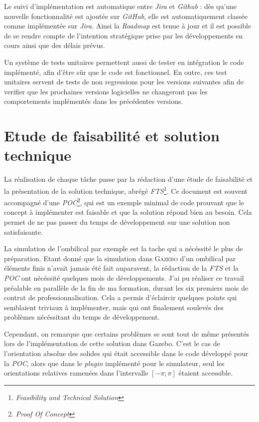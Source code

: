 			Le suivi d'implémentation est automatique entre \textit{Jira} et \textit{Github} : dès qu'une nouvelle fonctionnalité est ajoutée sur \textit{GitHub}, elle est automatiquement classée comme implémentée sur \textit{Jira}. Ainsi la \textit{Roadmap} est tenue à jour et il est possible de se rendre compte de l'intention stratégique prise par les développements en cours ainsi que des délais prévus.

			Un système de tests unitaires permettent aussi de tester en intégration le code implémenté, afin d'être sûr que le code est fonctionnel. En outre, ces test unitaires servent de tests de non regressions pour les versions suivantes afin de verifier que les prochaines versions logicielles ne changeront pas les comportements implémentés dans les précédentes versions.

		\section{Etude de faisabilité et solution technique}

			La réalisation de chaque tâche passe par la rédaction d'une étude de faisabilité et la présentation de la solution technique, abrégé \textit{FTS}\footnote{\textit{Feasibility and Technical Solution}}. Ce document est souvent accompagné d'une \textit{POC}\footnote{\textit{Proof Of Concept}}, qui est un exemple minimal de code prouvant que le concept à implémenter est faisable et que la solution répond bien au besoin. Cela permet de ne pas passer du temps de développement sur une solution non satisfaisante.

			La simulation de l'ombilical par exemple est la tache qui a nécéssité le plus de préparation. Etant donné que la simulation dans \textsc{Gazebo} d'un ombilical par éléments finis n'avait jamais été fait auparavent, la rédaction de la \textit{FTS} et la \textit{POC} ont nécéssité quelques mois de développements. J'ai pu réaliser ce travail préalable en parallèle de la fin de ma formation, durant les six premiers mois de contrat de professionnalisation. Cela a permis d'éclaircir quelques points qui semblaient triviaux à implémenter, mais qui ont finalement soulevés des problèmes nécéssitant du temps de développement. 
			
			Cependant, on remarque que certains problèmes se sont tout de même présentés lors de l'implémentation de cette solution dans \gls{Gazebo}. C'est le cas de l'orientation absolue des solides qui était accessible dans le code développé pour la \textit{POC}, alors que dans le \textit{plugin} implémenté pour le simulateur, seul les orientations relatives ramenées dans l'intervalle $[-\pi; \pi]$ étaient accessible.